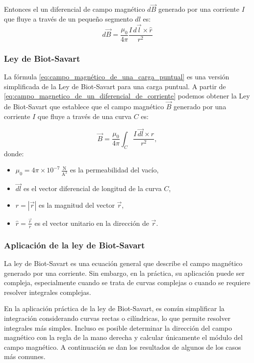 Entonces el un diferencial de campo magnético \(d\vec{B}\) generado por una corriente \(I\) que fluye a través de un pequeño segmento \(dl\) es:
\begin{equation}
  \boxed{d\vec{B} = \frac{\mu_0}{4\pi} \frac{I \, d\vec{l} \times \hat{r}}{r^2}}
  \label{eq:campo_magnetico_de_un_diferencial_de_corriente}
\end{equation}

\subsubsection{Ley de Biot-Savart}

La fórmula \ref{eq:campo_magnético_de_una_carga_puntual} es una versión simplificada de la Ley de Biot-Savart para una carga puntual. A partir de \eqref{eq:campo_magnetico_de_un_diferencial_de_corriente} podemos obtener la Ley de Biot-Savart que establece que el campo magnético \(\vec{B}\) generado por una corriente \(I\) que fluye a través de una curva \(C\) es:

\begin{equation}
  \vec{B} = \frac{\mu_0}{4\pi} \int_C \frac{I \, \vec{dl} \times \hat{r}}{r^2},
\end{equation}
donde:
\begin{itemize}
  \item \(\mu_0 = 4 \pi \times 10^{-7} \, \frac{\si{\newton}}{\si{\ampere\squared}}\) es la permeabilidad del vacío,
  \item \(\vec{dl}\) es el vector diferencial de longitud de la curva \(C\),
  \item \(r = |\vec{r}|\) es la magnitud del vector \(\vec{r}\),
  \item \(\hat{r} = \frac{\vec{r}}{r}\) es el vector unitario en la dirección de \(\vec{r}\).
\end{itemize}

\subsubsection{Aplicación de la ley de Biot-Savart}
\label{sec:aplicacion_de_la_ley_de_biot_savart}

La ley de Biot-Savart es una ecuación general que describe el campo magnético generado por una corriente. Sin embargo, en la práctica, su aplicación puede ser compleja, especialmente cuando se trata de curvas complejas o cuando se requiere resolver integrales complejas.

En la aplicación práctica de la ley de Biot-Savart, es común simplificar la integración considerando curvas rectas o cilíndricas, lo que permite resolver integrales más simples. Incluso es posible determinar la dirección del campo magnético con la regla de la mano derecha y calcular únicamente el módulo del campo magnético. A continuación se dan los resultados de algunos de los casos más comunes.

